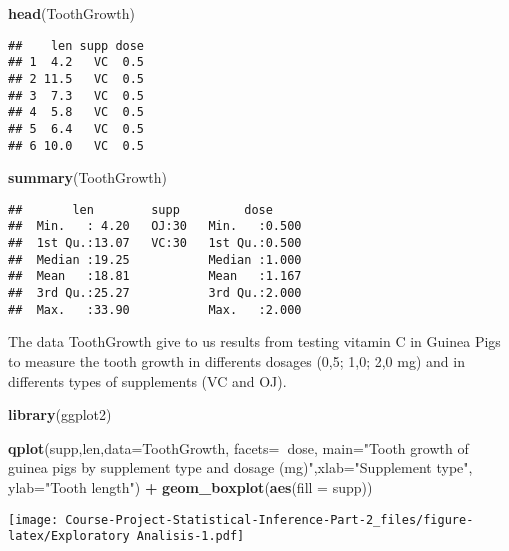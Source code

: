 \documentclass[]{article}
\newenvironment{Shaded}{\begin{snugshade}}{\end{snugshade}}
\newcommand{\DataTypeTok}[1]{\textcolor[rgb]{0.13,0.29,0.53}{#1}}
\newcommand{\KeywordTok}[1]{\textcolor[rgb]{0.13,0.29,0.53}{\textbf{#1}}}
\newcommand{\NormalTok}[1]{#1}
\newcommand{\OperatorTok}[1]{\textcolor[rgb]{0.81,0.36,0.00}{\textbf{#1}}}
\newcommand{\StringTok}[1]{\textcolor[rgb]{0.31,0.60,0.02}{#1}}
\begin{document}
\begin{Shaded}
\begin{Highlighting}[]
\KeywordTok{head}\NormalTok{(ToothGrowth)}
\end{Highlighting}
\end{Shaded}

\begin{verbatim}
##    len supp dose
## 1  4.2   VC  0.5
## 2 11.5   VC  0.5
## 3  7.3   VC  0.5
## 4  5.8   VC  0.5
## 5  6.4   VC  0.5
## 6 10.0   VC  0.5
\end{verbatim}

\begin{Shaded}
\begin{Highlighting}[]
\KeywordTok{summary}\NormalTok{(ToothGrowth)}
\end{Highlighting}
\end{Shaded}

\begin{verbatim}
##       len        supp         dose      
##  Min.   : 4.20   OJ:30   Min.   :0.500  
##  1st Qu.:13.07   VC:30   1st Qu.:0.500  
##  Median :19.25           Median :1.000  
##  Mean   :18.81           Mean   :1.167  
##  3rd Qu.:25.27           3rd Qu.:2.000  
##  Max.   :33.90           Max.   :2.000
\end{verbatim}

The data ToothGrowth give to us results from testing vitamin C in Guinea
Pigs to measure the tooth growth in differents dosages (0,5; 1,0; 2,0
mg) and in differents types of supplements (VC and OJ).

\begin{Shaded}
\begin{Highlighting}[]
\KeywordTok{library}\NormalTok{(ggplot2)}

\KeywordTok{qplot}\NormalTok{(supp,len,}\DataTypeTok{data=}\NormalTok{ToothGrowth, }\DataTypeTok{facets=}\OperatorTok{~}\NormalTok{dose, }\DataTypeTok{main=}\StringTok{"Tooth growth of guinea pigs by supplement type and dosage (mg)"}\NormalTok{,}\DataTypeTok{xlab=}\StringTok{"Supplement type"}\NormalTok{, }\DataTypeTok{ylab=}\StringTok{"Tooth length"}\NormalTok{) }\OperatorTok{+}\StringTok{ }\KeywordTok{geom_boxplot}\NormalTok{(}\KeywordTok{aes}\NormalTok{(}\DataTypeTok{fill =}\NormalTok{ supp))}
\end{Highlighting}
\end{Shaded}

\texttt{[image: Course-Project-Statistical-Inference-Part-2\_files/figure-latex/Exploratory Analisis-1.pdf]}
\end{document}
